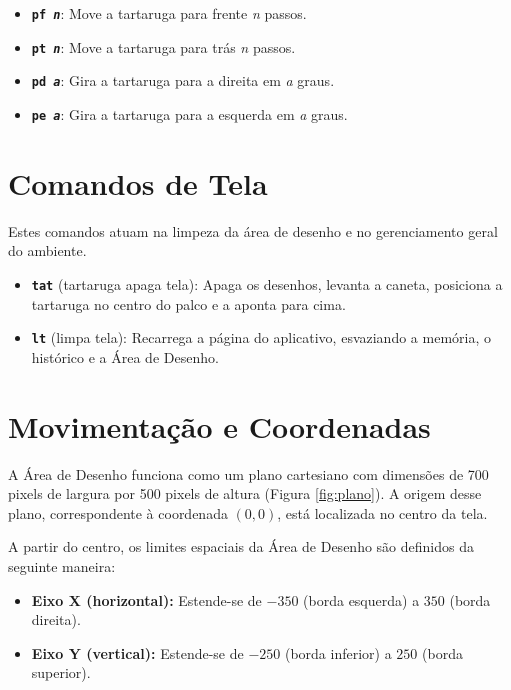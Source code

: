 \documentclass[12pt,a4paper]{report}
\begin{document}
	\begin{itemize}
		\item \textbf{\texttt{pf \textit{n}}}: Move a tartaruga para frente \textit{n} passos.
		\item \textbf{\texttt{pt \textit{n}}}: Move a tartaruga para trás \textit{n} passos.
		\item \textbf{\texttt{pd \textit{a}}}: Gira a tartaruga para a direita em \textit{a} graus.
		\item \textbf{\texttt{pe \textit{a}}}: Gira a tartaruga para a esquerda em \textit{a} graus.
	\end{itemize}
	
	\section{Comandos de Tela}
	
	Estes comandos atuam na limpeza da área de desenho e no gerenciamento geral do ambiente.
	
	\begin{itemize}
		\item \textbf{\texttt{tat}} (tartaruga apaga tela): Apaga os desenhos, levanta a caneta, posiciona a tartaruga no centro do palco e a aponta para cima.
		\item \textbf{\texttt{lt}} (limpa tela): Recarrega a página do aplicativo, esvaziando a memória, o histórico e a Área de Desenho.
	\end{itemize}
	
	\section{Movimentação e Coordenadas}
	
	A Área de Desenho funciona como um plano cartesiano com dimensões de 700 pixels de largura por 500 pixels de altura (Figura \ref{fig:plano}). A origem desse plano, correspondente à coordenada $(0, 0)$, está localizada no centro da tela.
	
	A partir do centro, os limites espaciais da Área de Desenho são definidos da seguinte maneira:
	\begin{itemize}
		\item \textbf{Eixo X (horizontal):} Estende-se de $-350$ (borda esquerda) a $350$ (borda direita).
		\item \textbf{Eixo Y (vertical):} Estende-se de $-250$ (borda inferior) a $250$ (borda superior).
	\end{itemize}
	
\end{document}
